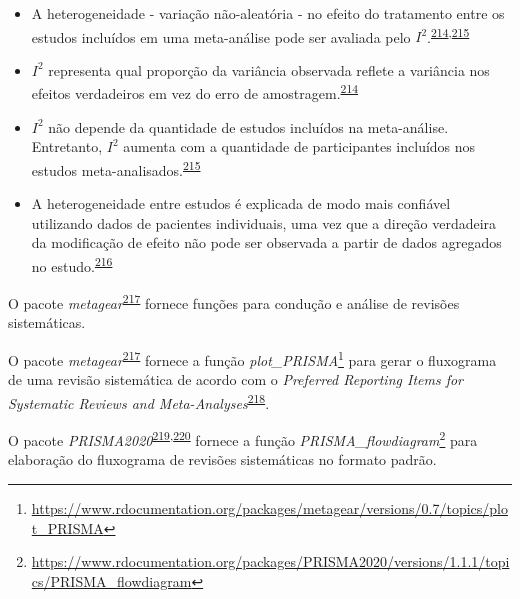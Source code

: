 \documentclass[
  a4paper,
]{book}
\renewcommand{\href}[2]{#2\footnote{\url{#1}}}
\newenvironment{infobox}[1]
  {
  \begin{itemize}
  \renewcommand{\labelitemi}{
    \raisebox{-.7\height}[0pt][0pt]{
      {\setkeys{Gin}{width=3em,keepaspectratio}
        \texttt{[image: \#1]}}
    }
  }
  \setlength{\fboxsep}{1em}
  \begin{blackbox}
  \item
  }
  {
  \end{blackbox}
  \end{itemize}
  }
\begin{document}
\begin{itemize}
\item
  A heterogeneidade - variação não-aleatória - no efeito do tratamento entre os estudos incluídos em uma meta-análise pode ser avaliada pelo \(I^{2}\).\textsuperscript{\protect\hyperlink{ref-Borenstein2022}{214},\protect\hyperlink{ref-Ruxfccker2008}{215}}
\item
  \(I^{2}\) representa qual proporção da variância observada reflete a variância nos efeitos verdadeiros em vez do erro de amostragem.\textsuperscript{\protect\hyperlink{ref-Borenstein2022}{214}}
\item
  \(I^{2}\) não depende da quantidade de estudos incluídos na meta-análise. Entretanto, \(I^{2}\) aumenta com a quantidade de participantes incluídos nos estudos meta-analisados.\textsuperscript{\protect\hyperlink{ref-Ruxfccker2008}{215}}
\item
  A heterogeneidade entre estudos é explicada de modo mais confiável utilizando dados de pacientes individuais, uma vez que a direção verdadeira da modificação de efeito não pode ser observada a partir de dados agregados no estudo.\textsuperscript{\protect\hyperlink{ref-degrooth2023}{216}}
\end{itemize}

\begin{infobox}{images/Rlogo}
O pacote \emph{metagear}\textsuperscript{\protect\hyperlink{ref-metagear}{217}} fornece funções para condução e análise de revisões sistemáticas.

\end{infobox}

\begin{infobox}{images/Rlogo}
O pacote \emph{metagear}\textsuperscript{\protect\hyperlink{ref-metagear}{217}} fornece a função \href{https://www.rdocumentation.org/packages/metagear/versions/0.7/topics/plot_PRISMA}{\emph{plot\_PRISMA}} para gerar o fluxograma de uma revisão sistemática de acordo com o \emph{Preferred Reporting Items for Systematic Reviews and Meta-Analyses}\textsuperscript{\protect\hyperlink{ref-Moher2015}{218}}.

\end{infobox}

\begin{infobox}{images/Rlogo}
O pacote \emph{PRISMA2020}\textsuperscript{\protect\hyperlink{ref-PRISMA2020-2}{219},\protect\hyperlink{ref-PRISMA2020}{220}} fornece a função \href{https://www.rdocumentation.org/packages/PRISMA2020/versions/1.1.1/topics/PRISMA_flowdiagram}{\emph{PRISMA\_flowdiagram}} para elaboração do fluxograma de revisões sistemáticas no formato padrão.

\end{infobox}
\end{document}
